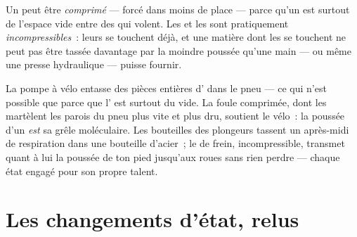 \begin{proposition}\label{prop:g7:states-of-matter:squeeze}
Un  peut être \emph{comprimé} --- forcé dans
moins de place --- parce qu'un  est surtout de l'espace vide entre
des  qui volent. Les  et les  sont
pratiquement \emph{incompressibles}~: leurs
 se touchent déjà, et une matière dont les  se
touchent ne peut pas être tassée davantage par la moindre poussée
qu'une main --- ou même une presse hydraulique --- puisse fournir.
\end{proposition}

\begin{example}\label{ex:g7:states-of-matter:squeezed}
La pompe à vélo entasse des pièces entières d' dans le pneu ---
ce qui n'est possible que parce que l' est surtout du vide. La
foule comprimée, dont les  martèlent les parois du pneu plus
vite et plus dru, soutient le vélo~: la poussée d'un  \emph{est}
sa grêle moléculaire. Les bouteilles des plongeurs tassent un
après-midi de respiration dans une bouteille d'acier~; le  de
frein, incompressible, transmet quant à lui la poussée de ton pied
jusqu'aux roues sans rien perdre --- chaque état engagé pour son
propre talent.
\end{example}

\section{Les changements d'état, relus}

